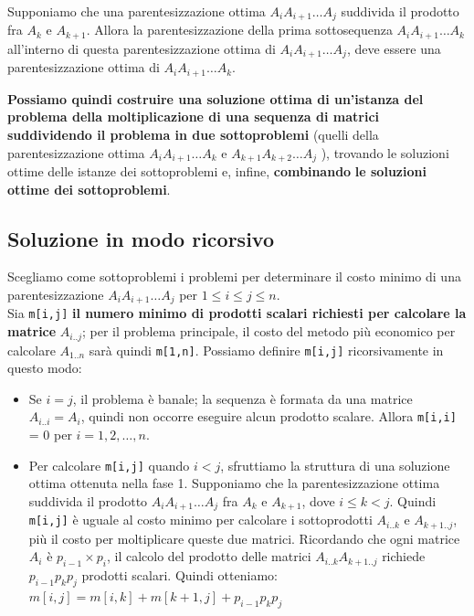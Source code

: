 \begin{myblockquote}
  Supponiamo che una parentesizzazione ottima $A_i A_{i+1} \ldots A_j$
  suddivida \linebreak il prodotto fra $A_k$ e $A_{k+1}$. Allora la
  parentesizzazione della prima sottosequenza $A_i A_{i+1} \ldots A_k$
  all'interno di questa parentesizzazione ottima di
  $A_i A_{i+1} \ldots A_j$, deve essere una parentesizzazione ottima di
  $A_i A_{i+1} \ldots A_k$.
\end{myblockquote}

\textbf{Possiamo quindi costruire una soluzione ottima di un'istanza del
  problema della moltiplicazione di una sequenza di matrici suddividendo
  il problema in due sottoproblemi} (quelli della parentesizzazione ottima
$A_i A_{i+1} \ldots A_k$ e $A_{k+1} A_{k+2} \ldots A_j$ ), trovando le
soluzioni ottime delle istanze dei sottoproblemi e, infine,
\textbf{combinando} \textbf{le soluzioni ottime dei sottoproblemi}.

\subsection{Soluzione in modo ricorsivo}

Scegliamo come sottoproblemi i problemi per determinare il costo minimo
di una parentesizzazione $A_i A_{i+1} \ldots A_j$ per
$1 \le i \le j \le n$.\\ Sia \texttt{m[i,j]} \textbf{il numero
  minimo di prodotti scalari richiesti per calcolare la matrice}
$A_{i..j}$; per il problema principale, il costo del metodo più
economico per calcolare $A_{1..n}$ sarà quindi \texttt{m[1,n]}.
Possiamo definire \texttt{m[i,j]} ricorsivamente in questo modo:
\begin{itemize}
  \item Se $i = j$, il problema è banale; la sequenza è formata da una matrice
        $A_{i..i} = A_i$, quindi non occorre eseguire alcun prodotto scalare.
        Allora \texttt{m[i,i]} = 0 per $i=1,2,\ldots,n$.
  \item Per calcolare \texttt{m[i,j]} quando $i < j$, sfruttiamo la struttura di una
        soluzione ottima ottenuta nella fase 1.
        Supponiamo che la parentesizzazione ottima suddivida il prodotto
        $A_i A_{i+1} \ldots A_j$ fra $A_k$ e $A_{k+1}$, dove $i \le k < j$.
        Quindi \texttt{m[i,j]} è uguale al costo minimo per calcolare i
        sottoprodotti $A_{i..k}$ e $A_{k+1..j}$, più il costo per
        moltiplicare queste due matrici. Ricordando che ogni matrice $A_i$ è
        $p_{i-1} \times p_i$, il calcolo del prodotto delle matrici
        $A_{i..k} A_{k+1..j}$ richiede $p_{i-1} p_k p_j$ prodotti scalari.
        Quindi otteniamo: $m[i,j] = m[i,k] + m[k+1,j] + p_{i-1} p_k p_j$
\end{itemize}

